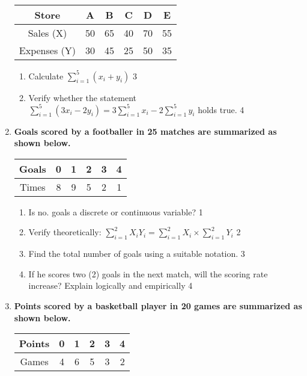\documentclass[a4paper,oneside]{book}
\begin{document}
\begin{enumerate}
\begin{table}[h]
\centering
\begin{tabular}{c|ccccc}
Store & A & B & C & D & E \\ \hline
Sales (X) & 50 & 65 & 40 & 70 & 55 \\ \hline
Expenses (Y) & 30 & 45 & 25 & 50 & 35
\end{tabular}
\end{table}

\begin{enumerate}
    \item 
    Calculate $\displaystyle \sum_{i=1}^5 (x_i + y_i)$ \hfill 3
    \item 
    Verify whether the statement $\displaystyle \sum_{i=1}^5 (3x_i - 2y_i) = 3 \sum_{i=1}^5 x_i - 2 \sum_{i=1}^5 y_i$ holds true. \hfill 4
\end{enumerate}


\item
	  \textbf{Goals scored by a footballer in 25 matches are summarized as shown below.} 
	  
	  \begin{table}[h]
	  \centering
\begin{tabular}{|c|ccccc|}
Goals & 0 & 1 & 2 & 3 & 4 \\ \hline
Times & 8 & 9 & 5 & 2 & 1
\end{tabular}
\end{table}
  
  \begin{enumerate}
    \item
	Is no. goals a discrete or continuous variable? \hfill 1
    \item
	Verify theoretically: $\displaystyle \sum_{i=1}^{2} X_iY_i = \sum_{i=1}^{2} X_i \times \sum_{i=1}^{2} Y_i$ \hfill 2
    \item  
	Find the total number of goals using a suitable notation. \hfill 3
    \item
	If he scores two (2) goals in the next match, will the scoring rate increase? Explain logically and empirically \hfill 4
  \end{enumerate}
  
  \item
\textbf{Points scored by a basketball player in 20 games are summarized as shown below.}

\begin{table}[h]
\centering
\begin{tabular}{|c|ccccc|}
Points & 0 & 1 & 2 & 3 & 4 \\ \hline
Games  & 4 & 6 & 5 & 3 & 2
\end{tabular}
\end{table}


\end{enumerate}
\end{document}
